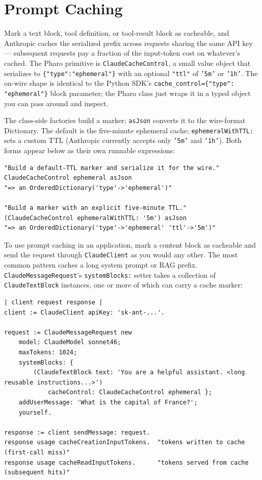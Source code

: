 \documentclass[a4paper,10pt,fleqn]{article}
\begin{document}
\section{Prompt Caching}
\label{sec:prompt-caching}

Mark a text block, tool definition, or tool-result block as
cacheable, and Anthropic caches the serialized prefix across
requests sharing the same API key --- subsequent requests pay a
fraction of the input-token cost on whatever's cached.  The Pharo
primitive is \texttt{ClaudeCacheControl}, a small value object
that serializes to \texttt{\{"type":"ephemeral"\}} with an
optional \texttt{"ttl"} of \texttt{'5m'} or \texttt{'1h'}.  The
on-wire shape is identical to the Python SDK's
\texttt{cache\_control=\{"type": "ephemeral"\}} block parameter;
the Pharo class just wraps it in a typed object you can pass
around and inspect.

The class-side factories build a marker; \texttt{asJson} converts
it to the wire-format Dictionary.  The default is the
five-minute ephemeral cache; \texttt{ephemeralWithTTL:} sets a
custom TTL (Anthropic currently accepts only \texttt{'5m'} and
\texttt{'1h'}).  Both forms appear below as their own runnable
expressions:

\begin{lstlisting}[language={}]
"Build a default-TTL marker and serialize it for the wire."
ClaudeCacheControl ephemeral asJson
"=> an OrderedDictionary('type'->'ephemeral')"

"Build a marker with an explicit five-minute TTL."
(ClaudeCacheControl ephemeralWithTTL: '5m') asJson
"=> an OrderedDictionary('type'->'ephemeral' 'ttl'->'5m')"
\end{lstlisting}

To use prompt caching in an application, mark a content block as
cacheable and send the request through \texttt{ClaudeClient} as
you would any other.  The most common pattern caches a long
system prompt or RAG prefix.  \texttt{ClaudeMessageRequest}'s
\texttt{systemBlocks:} setter takes a collection of
\texttt{ClaudeTextBlock} instances, one or more of which can
carry a cache marker:

\begin{lstlisting}[language={}]
| client request response |
client := ClaudeClient apiKey: 'sk-ant-...'.

request := ClaudeMessageRequest new
    model: ClaudeModel sonnet46;
    maxTokens: 1024;
    systemBlocks: {
        (ClaudeTextBlock text: 'You are a helpful assistant. <long reusable instructions...>')
            cacheControl: ClaudeCacheControl ephemeral };
    addUserMessage: 'What is the capital of France?';
    yourself.

response := client sendMessage: request.
response usage cacheCreationInputTokens.  "tokens written to cache (first-call miss)"
response usage cacheReadInputTokens.      "tokens served from cache (subsequent hits)"
\end{lstlisting}
\end{document}
